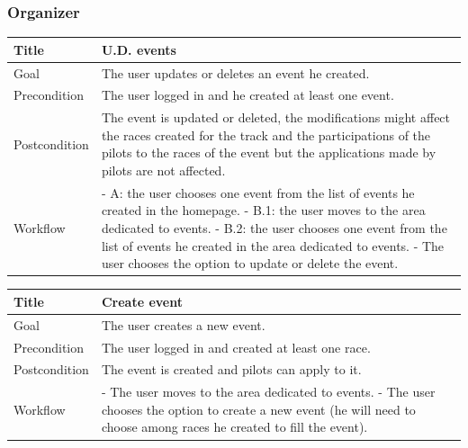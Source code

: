 \documentclass{beamer}
\begin{document}
\begin{frame}
    \frametitle{Organizer}
    \begin{table}
        \tiny
        \begin{tabular}{|p{2cm}|p{6cm}|}
        \hline
        Title & \textbf{U.D. events} \\
        \hline
        Goal & The user updates or deletes an event he created. \\
        \hline
        Precondition & The user logged in and he created at least one event. \\
        \hline
        Postcondition & The event is updated or deleted, the modifications might affect the races created for the track 
        and the participations of the pilots to the races of the event but the applications made by pilots are not affected. \\
        \hline
        Workflow &
        - A: the user chooses one event from the list of events he created in the homepage. \newline
        - B.1: the user moves to the area dedicated to events. \newline
        - B.2: the user chooses one event from the list of events he created in the area dedicated to events. \newline
        - The user chooses the option to update or delete the event. \\
        \hline
        \end{tabular}
\end{table}

\begin{table}
    \tiny
    \begin{tabular}{|p{2cm}|p{6cm}|}
    \hline
    Title & \textbf{Create event} \\
    \hline
    Goal & The user creates a new event. \\
    \hline
    Precondition & The user logged in and created at least one race.\\
    \hline
    Postcondition & The event is created and pilots can apply to it. \\
    \hline
    Workflow &
    - The user moves to the area dedicated to events. \newline
    - The user chooses the option to create a new event (he will need to choose among races he created
    to fill the event). \\
    \hline
    \end{tabular}
\end{table}

\end{frame}
\end{document}
